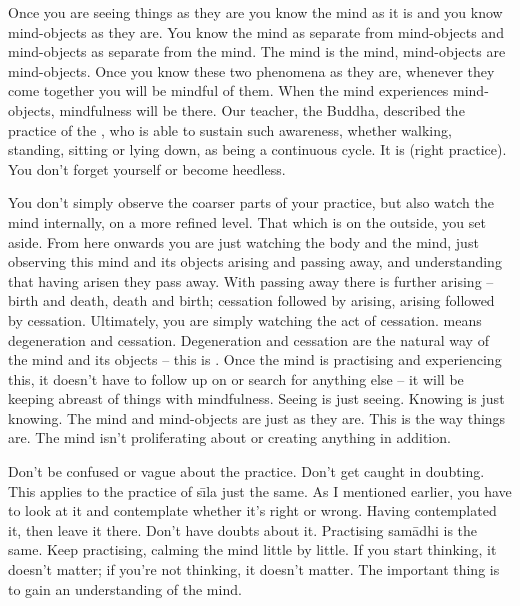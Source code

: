 Once you are seeing things as they are you know the mind as it is and you know mind-objects as they are. You know the mind as separate from mind-objects and mind-objects as separate from the mind. The mind is the mind, mind-objects are mind-objects. Once you know these two phenomena as they are, whenever they come together you will be mindful of them. When the mind experiences mind-objects, mindfulness will be there. Our teacher, the Buddha, described the practice of the , who is able to sustain such awareness, whether walking, standing, sitting or lying down, as being a continuous cycle. It is  (right practice). You don't forget yourself or become heedless.

You don't simply observe the coarser parts of your practice, but also watch the mind internally, on a more refined level. That which is on the outside, you set aside. From here onwards you are just watching the body and the mind, just observing this mind and its objects arising and passing away, and understanding that having arisen they pass away. With passing away there is further arising -- birth and death, death and birth; cessation followed by arising, arising followed by cessation. Ultimately, you are simply watching the act of cessation.  means degeneration and cessation. Degeneration and cessation are the natural way of the mind and its objects -- this is . Once the mind is practising and experiencing this, it doesn't have to follow up on or search for anything else -- it will be keeping abreast of things with mindfulness. Seeing is just seeing. Knowing is just knowing. The mind and mind-objects are just as they are. This is the way things are. The mind isn't proliferating about or creating anything in addition.

Don't be confused or vague about the practice. Don't get caught in doubting. This applies to the practice of s\={\i}la just the same. As I mentioned earlier, you have to look at it and contemplate whether it's right or wrong. Having contemplated it, then leave it there. Don't have doubts about it. Practising sam\=adhi is the same. Keep practising, calming the mind little by little. If you start thinking, it doesn't matter; if you're not thinking, it doesn't matter. The important thing is to gain an understanding of the mind.

